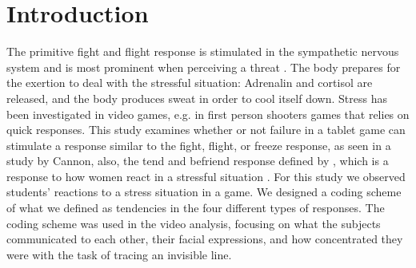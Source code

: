 \section*{Introduction}
The primitive fight and flight response is stimulated in the sympathetic nervous system and is most prominent when perceiving a threat \cite{bodily_changes}. The body prepares for the exertion to deal with the stressful situation: Adrenalin and cortisol are released, and the body produces sweat in order to cool itself down. Stress has been investigated in video games, e.g. in first person shooters games that relies on quick responses. This study examines whether or not failure in a tablet game can stimulate a response similar to the fight, flight, or freeze response, as seen in a study by Cannon, also, the tend and befriend response defined by \cite{tendbefriend}, which is a response to how women react in a stressful situation \cite{tendbefriend}. For this study we observed students’ reactions to a stress situation in a game. We designed a coding scheme of what we defined as tendencies in the four different types of responses. The coding scheme was used in the video analysis, focusing on what the subjects communicated to each other, their facial expressions, and how concentrated they were with the task of tracing an invisible line. 

